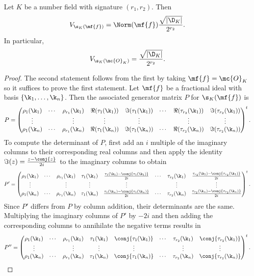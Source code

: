     \begin{proposition}\label{prop:covolume_of_fractional_ideal_under_canonical_embedding}
      Let $K$ be a number field with signature $(r_{1},r_{2})$. Then
      \[
        V_{\s_{K}(\mf{f})} = \Norm(\mf{f})\frac{\sqrt{|\D_{K}|}}{2^{r_{2}}}.
      \]
      In particular,
      \[
        V_{\s_{K}(\mc{O}_{K})} = \frac{\sqrt{|\D_{K}|}}{2^{r_{2}}}.
      \]
    \end{proposition}
    \begin{proof}
      The second statement follows from the first by taking $\mf{f} = \mc{O}_{K}$ so it suffices to prove the first statement. Let $\mf{f}$ be a fractional ideal with basis $\{\k_{1},\ldots,\k_{n}\}$. Then the associated generator matrix $P$ for $\s_{K}(\mf{f})$ is
      \[
        P = \begin{pmatrix} \rho_{1}(\k_{1}) & \cdots & \rho_{r_{1}}(\k_{1}) & \Re(\tau_{1}(\k_{1})) & \Im(\tau_{1}(\k_{1})) & \cdots & \Re(\tau_{r_{2}}(\k_{1})) & \Im(\tau_{r_{2}}(\k_{1})) \\ \vdots & & \vdots & \vdots & \vdots & & \vdots & \vdots \\ \rho_{1}(\k_{n}) & \cdots & \rho_{r_{1}}(\k_{n}) & \Re(\tau_{1}(\k_{n})) & \Im(\tau_{1}(\k_{n})) & \cdots & \Re(\tau_{r_{2}}(\k_{n})) & \Im(\tau_{r_{2}}(\k_{n})) \end{pmatrix}^{t}.
      \]
      To compute the determinant of $P$, first add an $i$ multiple of the imaginary columns to their corresponding real columns and then apply the identity $\Im(z) = \frac{z-\conj{z}}{2i}$ to the imaginary columns to obtain
      \[
        P' = \begin{pmatrix} \rho_{1}(\k_{1}) & \cdots & \rho_{r_{1}}(\k_{1}) & \tau_{1}(\k_{1}) & \frac{\tau_{1}(\k_{1})-\conj{\tau_{1}(\k_{1})}}{2i} & \cdots & \tau_{r_{2}}(\k_{1}) & \frac{\tau_{r_{2}}(\k_{1})-\conj{\tau_{r_{2}}(\k_{1})}}{2i} \\ \vdots & & \vdots & \vdots & \vdots & & \vdots & \vdots \\ \rho_{1}(\k_{n}) & \cdots & \rho_{r_{1}}(\k_{n}) & \tau_{1}(\k_{n}) & \frac{\tau_{1}(\k_{n})-\conj{\tau_{1}(\k_{n})}}{2i} & \cdots & \tau_{r_{2}}(\k_{n}) & \frac{\tau_{r_{2}}(\k_{n})-\conj{\tau_{r_{2}}(\k_{n})}}{2i} \end{pmatrix}^{t}.
      \]
      Since $P'$ differs from $P$ by column addition, their determinants are the same. Multiplying the imaginary columns of $P'$ by $-2i$ and then adding the corresponding columns to annihilate the negative terms results in
      \[
        P'' = \begin{pmatrix} \rho_{1}(\k_{1}) & \cdots & \rho_{r_{1}}(\k_{1}) & \tau_{1}(\k_{1}) &\conj{\tau_{1}(\k_{1})} & \cdots & \tau_{r_{2}}(\k_{1}) & \conj{\tau_{r_{2}}(\k_{1})} \\ \vdots & & \vdots & \vdots & \vdots & & \vdots & \vdots \\ \rho_{1}(\k_{n}) & \cdots & \rho_{r_{1}}(\k_{n}) & \tau_{1}(\k_{n}) & \conj{\tau_{1}(\k_{n})} & \cdots & \tau_{r_{2}}(\k_{n}) & \conj{\tau_{r_{2}}(\k_{n})} \end{pmatrix}^{t}.
\]
\end{proof}

